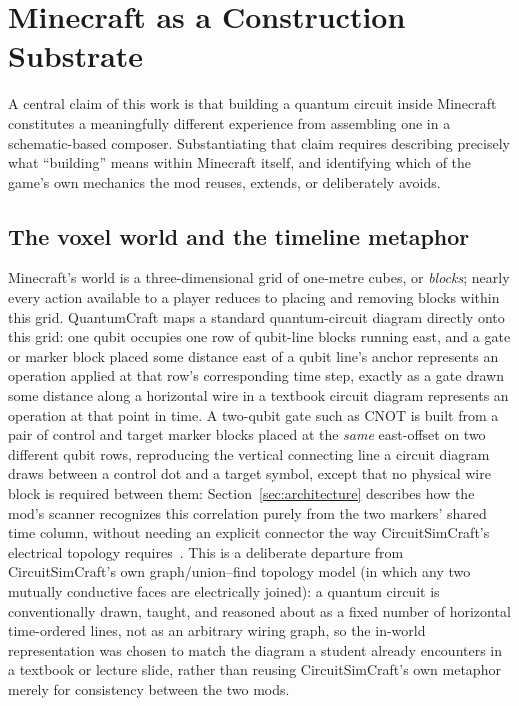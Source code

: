 \section{Minecraft as a Construction Substrate}
\label{sec:minecraft-mechanics}

A central claim of this work is that building a quantum circuit inside Minecraft constitutes
a meaningfully different experience from assembling one in a schematic-based composer.
Substantiating that claim requires describing precisely what ``building'' means within
Minecraft itself, and identifying which of the game's own mechanics the mod reuses, extends,
or deliberately avoids.

\subsection{The voxel world and the timeline metaphor}

Minecraft's world is a three-dimensional grid of one-metre cubes, or \emph{blocks}; nearly
every action available to a player reduces to placing and removing blocks within this grid.
QuantumCraft maps a standard quantum-circuit diagram directly onto this grid: one qubit
occupies one row of qubit-line blocks running east, and a gate or marker block placed some
distance east of a qubit line's anchor represents an operation applied at that row's
corresponding time step, exactly as a gate drawn some distance along a horizontal wire in a
textbook circuit diagram represents an operation at that point in time. A two-qubit gate
such as CNOT is built from a pair of control and target marker blocks placed at the
\emph{same} east-offset on two different qubit rows, reproducing the vertical connecting line
a circuit diagram draws between a control dot and a target symbol, except that no physical
wire block is required between them: Section~\ref{sec:architecture} describes how the mod's
scanner recognizes this correlation purely from the two markers' shared time column, without
needing an explicit connector the way CircuitSimCraft's electrical topology
requires~\cite{picos2026circuitsimcraft}. This is a deliberate departure from CircuitSimCraft's own
graph/union--find topology model (in which any two mutually conductive faces are
electrically joined): a quantum circuit is conventionally drawn, taught, and reasoned about as
a fixed number of horizontal time-ordered lines, not as an arbitrary wiring graph, so the
in-world representation was chosen to match the diagram a student already encounters in a
textbook or lecture slide, rather than reusing CircuitSimCraft's own metaphor merely for
consistency between the two mods.

